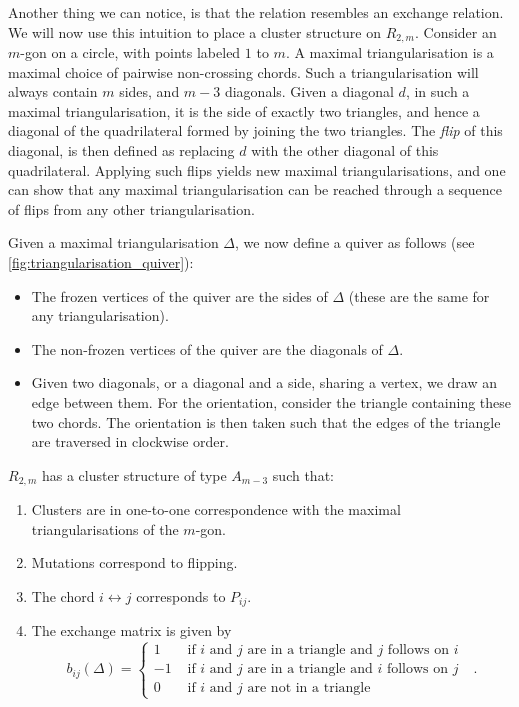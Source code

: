 \documentclass{article}
\begin{document}
Another thing we can notice, is that the relation resembles an exchange relation. We
will now use this intuition to place a cluster structure on $R_{2, m}$. Consider an
$m$-gon on a circle, with points labeled $1$ to $m$. A maximal triangularisation is a
maximal choice of pairwise non-crossing chords. Such a triangularisation will always
contain $m$ sides, and $m-3$ diagonals. Given a diagonal $d$, in such a maximal
triangularisation, it is the side of exactly two triangles, and hence a diagonal of the
quadrilateral formed by joining the two triangles. The \emph{flip} of this diagonal, is
then defined as replacing $d$ with the other diagonal of this quadrilateral. Applying
such flips yields new maximal triangularisations, and one can show that any maximal
triangularisation can be reached through a sequence of flips from any other
triangularisation.

Given a maximal triangularisation $\Delta$, we now define a quiver as follows (see
\cref{fig:triangularisation_quiver}):
\begin{itemize}
	\item The frozen vertices of the quiver are the sides of $\Delta$ (these are the same for any
	      triangularisation).
	\item The non-frozen vertices of the quiver are the diagonals of $\Delta$.
	\item Given two diagonals, or a diagonal and a side, sharing a vertex, we draw an edge
	      between them. For the orientation, consider the triangle containing these two chords.
	      The orientation is then taken such that the edges of the triangle are traversed in
	      clockwise order.
\end{itemize}

\begin{theorem}
	$R_{2,m}$ has a cluster structure of type $A_{m-3}$ such that:
	\begin{enumerate}
		\item Clusters are in one-to-one correspondence with the maximal triangularisations of the
		      $m$-gon.
		\item Mutations correspond to flipping.
		\item The chord $i \leftrightarrow j$ corresponds to $P_{ij}$.
		\item The exchange matrix is given by
		      \begin{equation*}
			      b_{ij}(\Delta) =
			      \begin{cases}
				      1  & \text{ if $i$ and $j$ are in a triangle and $j$ follows on $i$ } \\
				      -1 & \text{ if $i$ and $j$ are in a triangle and $i$ follows on $j$ } \\
				      0  & \text{ if $i$ and $j$ are not in a triangle}
			      \end{cases}
			      .
		      \end{equation*}
	\end{enumerate}
\end{theorem}
\end{document}
